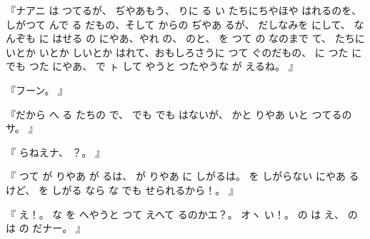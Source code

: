 『ナアニ
は
つてるが、
ぢやあもう、
りに
る
い
たちにちやほや
はれるのを、
しがつて
んで
る
だもの、そして
からの
ぢやあ
るが、
だしなみを
にして、
なんぞも
に
はせる
の
にやあ、やれ
の、
のと、
を
つて
の
なのまで
て、
たちに
いとか
いとか
しいとか
はれて、おもしろさうに
つて
ぐのだもの、
に
つた
にでも
つた
にやあ、
で
ㇳ
して
やうと
つたやうな
が
えるね。
』

『フーン。
』

『だから
へ
る
たちの
で、
でも
でも
はないが、
かと
りやあ
いと
つてるのサ。
』

『
らねえナ、
？。
』

『
つて
が
りやあ
が
るは、
が
りやあ
に
しがるは。
を
しがらない
にやあ
るけど、
を
しがる
なら
な
でも
せられるから！。
』

『
え！。
な
を
へやうと
つて
えへて
るのかエ？。
オヽ
い！。
の
は
え、
の
は
の
だナー。
』


